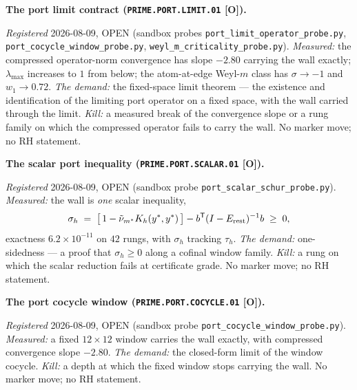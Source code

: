 \par\smallskip\noindent\textbf{The port limit contract
(\texttt{PRIME.PORT.\allowbreak LIMIT.01} [O]).}
{\sloppy
\emph{Registered} 2026-08-09, OPEN (sandbox probes
\texttt{port\_limit\_operator\_probe.py},
\texttt{port\_cocycle\_window\_probe.py},
\texttt{weyl\_m\_criticality\_probe.py}).  \emph{Measured:} the
compressed operator-norm convergence has slope $-2.80$ carrying
the wall exactly; $\lambda_{\max}$ increases to $1$ from below;
the atom-at-edge Weyl-$m$ class has $\sigma \to -1$ and $w_1 \to
0.72$.  \emph{The demand:} the fixed-space limit theorem --- the
existence and identification of the limiting port operator on a
fixed space, with the wall carried through the limit.
\emph{Kill:} a measured break of the convergence slope or a rung
family on which the compressed operator fails to carry the wall.
No marker move; no RH statement.\par}


\par\smallskip\noindent\textbf{The scalar port inequality
(\texttt{PRIME.PORT.\allowbreak SCALAR.01} [O]).}
{\sloppy
\emph{Registered} 2026-08-09, OPEN (sandbox probe
\texttt{port\_scalar\_schur\_probe.py}).  \emph{Measured:} the
wall is \emph{one} scalar inequality,
\[
\sigma_h \;=\; \big[\,1 - \tilde\nu_{m^{*}}K_h(y^{*},
y^{*})\,\big] - b^{\mathsf T}(I - E_{\rm rest})^{-1}b \;\ge\; 0,
\]
exactness $6.2\times10^{-11}$ on $42$ rungs, with $\sigma_h$
tracking $\tau_h$.  \emph{The demand:} one-sidedness --- a proof
that $\sigma_h \ge 0$ along a cofinal window family.  \emph{Kill:}
a rung on which the scalar reduction fails at certificate grade.
No marker move; no RH statement.\par}


\par\smallskip\noindent\textbf{The port cocycle window
(\texttt{PRIME.PORT.\allowbreak COCYCLE.01} [O]).}
{\sloppy
\emph{Registered} 2026-08-09, OPEN (sandbox probe
\texttt{port\_cocycle\_window\_probe.py}).  \emph{Measured:} a
fixed $12\times12$ window carries the wall exactly, with
compressed convergence slope $-2.80$.  \emph{The demand:} the
closed-form limit of the window cocycle.  \emph{Kill:} a depth at
which the fixed window stops carrying the wall.  No marker move;
no RH statement.\par}


